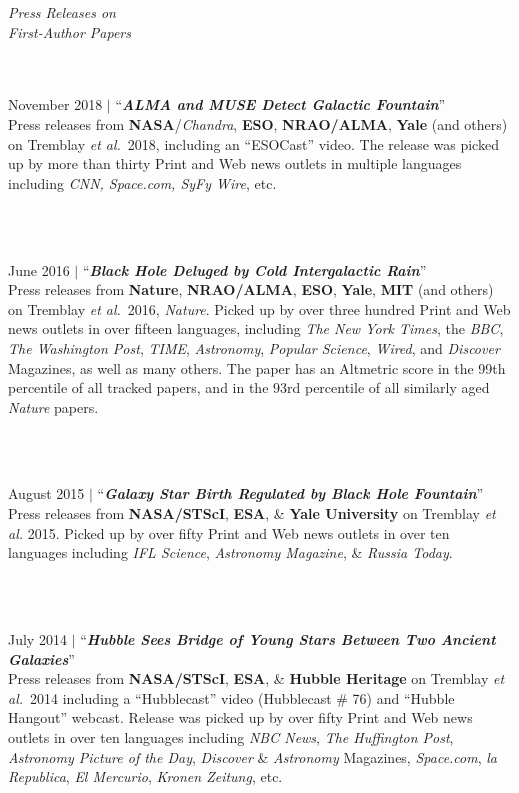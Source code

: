 \documentclass[11pt]{article}
\begin{document}
\vspace{4mm}

\hspace{2.5mm} \parbox{1.5in}{\textit{Press Releases on \\ First-Author Papers \\ \\ \\}}
\parbox{5.15in}{
November 2018 $|$ ``\textit{\textbf{ALMA and MUSE Detect Galactic Fountain}}'' \\ Press releases from \textbf{NASA}/\textit{Chandra}, \textbf{ESO}, \textbf{NRAO/ALMA}, \textbf{Yale} (and others) on Tremblay \textit{et al.}~2018, including an ``ESOCast'' video. The release was picked up by more than thirty Print and Web news outlets in multiple languages including \textit{CNN, Space.com, SyFy Wire}, etc.}\\ \\

\hspace{42mm} \parbox{5.15in}{June 2016 $|$ ``\textit{\textbf{Black Hole Deluged by Cold Intergalactic Rain}}'' \\ Press releases from \textbf{Nature}, \textbf{NRAO/ALMA}, \textbf{ESO}, \textbf{Yale}, \textbf{MIT} (and others) on Tremblay \textit{et al.}~2016, \textit{Nature}. Picked up by over three hundred Print and Web news outlets in over fifteen languages, including \textit{The New York Times}, the \textit{BBC}, \textit{The Washington Post}, \textit{TIME}, \textit{Astronomy}, \textit{Popular Science}, \textit{Wired}, and \textit{Discover} Magazines, as well as many others. The paper has an Altmetric score in the 99th percentile of all tracked papers, and in the 93rd percentile of all similarly aged \textit{Nature} papers. }\\ \\

\hspace{42mm} \parbox{5.15in}{August 2015 $|$ ``\textit{\textbf{Galaxy Star Birth Regulated by Black Hole Fountain}}''\\
Press releases from \textbf{NASA/STScI}, \textbf{ESA}, \& \textbf{Yale University} on Tremblay \textit{et al.} 2015. Picked up by over fifty Print and Web news outlets in over ten languages including \textit{IFL Science}, \textit{Astronomy Magazine}, \& \textit{Russia Today}. }\\\\

\hspace{42mm} \parbox{5.15in}{July 2014 $|$ ``\textbf{\textit{Hubble Sees Bridge of Young Stars Between Two Ancient Galaxies}}''\\ Press releases from \textbf{NASA/STScI}, \textbf{ESA}, \& \textbf{Hubble Heritage} on Tremblay \textit{et al.}~2014 including a ``Hubblecast'' video (Hubblecast \# 76) and ``Hubble Hangout'' webcast. Release was picked up by over fifty Print and Web news outlets in over ten languages including \textit{NBC News}, \textit{The Huffington Post}, \textit{Astronomy Picture of the Day}, \textit{Discover} \& \textit{Astronomy} Magazines, \textit{Space.com}, \textit{la Republica}, \textit{El Mercurio}, \textit{Kronen Zeitung}, etc.


}\\
\end{document}
